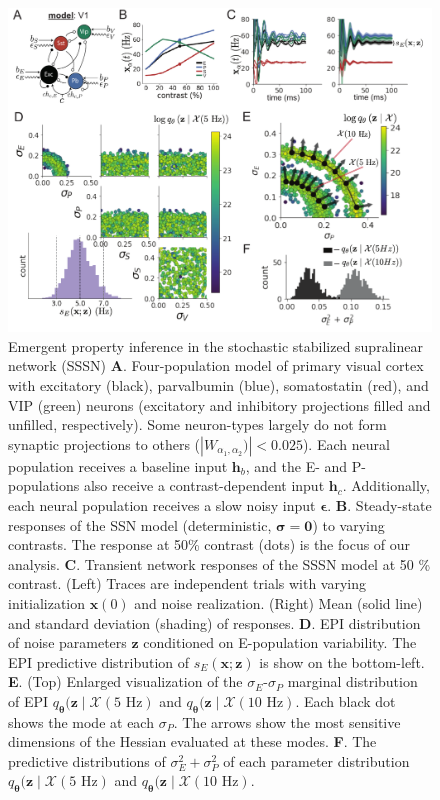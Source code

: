 \documentclass[11pt]{article}
\begin{document}
\begin{figure}
\vspace{-1cm}
\begin{center}
\includegraphics[scale=0.8]{figures/fig3/fig3.pdf}
\end{center}
\vspace{-1cm}
\caption{\small Emergent property inference in the stochastic stabilized supralinear network (SSSN)
\textbf{A}.  Four-population model of primary visual cortex with excitatory (black), parvalbumin (blue), somatostatin (red), and VIP (green) neurons (excitatory and inhibitory projections filled and unfilled, respectively).   
Some neuron-types largely do not form synaptic projections to others ($|W_{\alpha_1, \alpha_2})| < 0.025$).
Each neural population receives a baseline input $\mathbf{h}_b$, and the E- and P-populations also receive a contrast-dependent input $\mathbf{h}_c$.
Additionally, each neural population receives a slow noisy input $\bm{\epsilon}$.
\textbf{B}. Steady-state responses of the SSN model (deterministic, $\bm{\sigma}=\bm{0}$) to varying contrasts.  The response at 50\% contrast (dots) is the focus of our analysis.
\textbf{C}. Transient network responses of the SSSN model at 50 \% contrast. (Left) Traces are independent trials with varying initialization $\mathbf{x}(0)$ and noise realization. (Right) Mean (solid line) and standard deviation (shading) of responses.
\textbf{D}. EPI distribution of noise parameters $\mathbf{z}$ conditioned on E-population variability.
The EPI predictive distribution of $s_E(\mathbf{x}; \mathbf{z})$ is show on the bottom-left.
\textbf{E}. (Top) Enlarged visualization of the $\sigma_E$-$\sigma_P$ marginal distribution of EPI $q_{\bm{\theta}}(\mathbf{z} \mid \mathcal{X}(5\text{ Hz})$ and $q_{\bm{\theta}}(\mathbf{z} \mid \mathcal{X}(10\text{ Hz})$.
Each black dot shows the mode at each $\sigma_P$.
The arrows show the most sensitive dimensions of the Hessian evaluated at these modes.
\textbf{F}. The predictive distributions of $\sigma_E^2 + \sigma_P^2$ of each parameter distribution $q_{\bm{\theta}}(\mathbf{z} \mid \mathcal{X}(5\text{ Hz})$ and $q_{\bm{\theta}}(\mathbf{z} \mid \mathcal{X}(10\text{ Hz})$.
}
 \label{fig:V1}
\end{figure}
\end{document}
